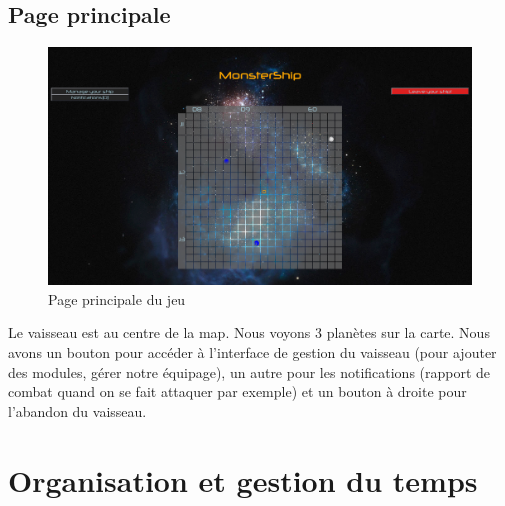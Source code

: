 \documentclass[a4paper,11pt]{report}
\begin{document}
    \section{Page principale}
        \begin{figure}[H]
            \begin{center}
                \includegraphics[width=\textwidth]{maquette/screens/main.png}
                \caption{Page principale du jeu}
                \label{fig:principale}
            \end{center}
        \end{figure}
        Le vaisseau est au centre de la map. Nous voyons 3 planètes sur la carte. Nous avons un bouton pour accéder à l'interface de gestion du vaisseau (pour ajouter des modules, gérer notre équipage), un autre pour les notifications (rapport de combat quand on se fait attaquer par exemple) et un bouton à droite pour l'abandon du vaisseau.

\chapter{Organisation et gestion du temps}
\end{document}
